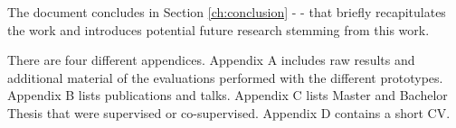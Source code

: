 

The document concludes in Section \ref{ch:conclusion} - \emph{} - that briefly recapitulates the work and introduces potential future research stemming from this work.

There are four different appendices. Appendix A includes raw results and additional material of the evaluations performed with the different prototypes. Appendix B lists publications and talks. Appendix C lists Master and Bachelor Thesis that were supervised or co-supervised. Appendix D contains a short CV.